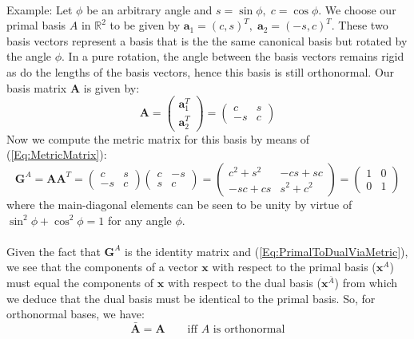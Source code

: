 \footnotesize
\paragraph{}Example:
Let $\phi$ be an arbitrary angle and $s = \sin \phi, \; c = \cos \phi$. We choose our primal basis $A$ in $\mathbb{R}^2$ to be given by $\mathbf{a}_1 = (c, s)^T, \; \mathbf{a}_2 = (-s, c)^T$. These two basis vectors represent a basis that is the the same canonical basis but rotated by the angle $\phi$. In a pure rotation, the angle between the basis vectors remains rigid as do the lengths of the basis vectors, hence this basis is still orthonormal. Our basis matrix $\mathbf{A}$ is given by:
\begin{equation}
 \mathbf{A} 
 = 
 \begin{pmatrix} 
  \mathbf{a}_1^T  \\
  \mathbf{a}_2^T 
 \end{pmatrix} 
 =
 \begin{pmatrix} 
   c & s  \\
  -s & c
 \end{pmatrix} 
\end{equation}
Now we compute the metric matrix for this basis by means of (\ref{Eq:MetricMatrix}):
\begin{equation}
 \mathbf{G}^{A} 
 = 
 \mathbf{A} \mathbf{A}^T
 = 
 \begin{pmatrix} 
   c & s  \\
  -s & c
 \end{pmatrix} 
 \begin{pmatrix} 
  c & -s  \\
  s &  c
 \end{pmatrix}   
 = 
 \begin{pmatrix} 
   c^2 + s^2 & -cs + sc  \\
  -sc  + cs  & s^2 + c^2
 \end{pmatrix}
 = 
 \begin{pmatrix} 
  1 & 0 \\
  0 & 1
 \end{pmatrix}    
\end{equation}
where the main-diagonal elements can be seen to be unity by virtue of $\sin^2 \phi + \cos^2 \phi = 1$ for any angle $\phi$.
\normalsize

\paragraph{}
Given the fact that $\mathbf{G}^{A}$ is the identity matrix and (\ref{Eq:PrimalToDualViaMetric}), we see that the components of a vector $\mathbf{x}$ with respect to the primal basis ($\mathbf{x}^A$) must equal the components of $\mathbf{x}$ with respect to the dual basis ($\mathbf{x}^{\bar{A}}$) from which we deduce that the dual basis must be identical to the primal basis. So, for orthonormal bases, we have:
\begin{equation}
 \bar{\mathbf{A}} = \mathbf{A} \qquad \text{iff $A$ is orthonormal} 
\end{equation}


